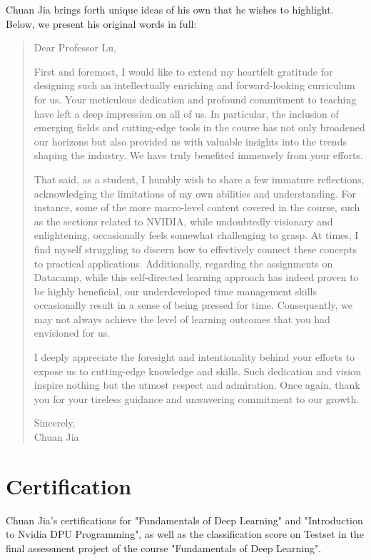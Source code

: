 \documentclass[12pt]{article}
\begin{document}
Chuan Jia brings forth unique ideas of his own that he wishes to highlight. Below, we present his original words in full:

\begin{quotation}
\noindent
Dear Professor Lu,

First and foremost, I would like to extend my heartfelt gratitude for designing such an intellectually enriching and forward-looking curriculum for us. Your meticulous dedication and profound commitment to teaching have left a deep impression on all of us. In particular, the inclusion of emerging fields and cutting-edge tools in the course has not only broadened our horizons but also provided us with valuable insights into the trends shaping the industry. We have truly benefited immensely from your efforts.  

That said, as a student, I humbly wish to share a few immature reflections, acknowledging the limitations of my own abilities and understanding. For instance, some of the more macro-level content covered in the course, such as the sections related to NVIDIA, while undoubtedly visionary and enlightening, occasionally feels somewhat challenging to grasp. At times, I find myself struggling to discern how to effectively connect these concepts to practical applications. Additionally, regarding the assignments on Datacamp, while this self-directed learning approach has indeed proven to be highly beneficial, our underdeveloped time management skills occasionally result in a sense of being pressed for time. Consequently, we may not always achieve the level of learning outcomes that you had envisioned for us.  

I deeply appreciate the foresight and intentionality behind your efforts to expose us to cutting-edge knowledge and skills. Such dedication and vision inspire nothing but the utmost respect and admiration. Once again, thank you for your tireless guidance and unwavering commitment to our growth.  

\begin{flushright}
Sincerely, \\ 
Chuan Jia
\end{flushright}
\end{quotation}

\section*{Certification}
Chuan Jia's certifications for "Fundamentals of Deep Learning" and "Introduction to Nvidia DPU Programming", as well as the classification score on Testset in the final assessment project of the course "Fundamentals of Deep Learning".
\end{document}

